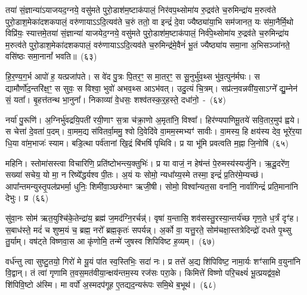 तया॑ सं॒ज्ञान्या॑\-ऽयाजयद॒ग्नये॒ वसु॑मते पुरो॒डाश॑\-म॒ष्टा\-क॑पालं॒ निर॑वप॒थ्सोमा॑य रु॒द्रव॑ते च॒रुमिन्द्रा॑य म॒रुत्व॑ते पुरो॒डाश॒मेका॑\-दश\-कपालं॒ वरु॑णाया\-ऽऽ\-दि॒त्यव॑ते च॒रुं ततो॒ वा इन्द्रं॑ दे॒वा ज्यैष्ठ्या॑या॒भि सम॑जानत॒ यः स॑मा॒नैर्मि॒थो विप्रि॑यः॒ स्यात्तमे॒तया॑ सं॒ज्ञान्या॑ याजयेद॒ग्नये॒ वसु॑मते पुरो॒डाश॑\-म॒ष्टा\-क॑पालं॒ निर्व॑पे॒थ्सोमा॑य रु॒द्रव॑ते च॒रुमिन्द्रा॑य म॒रुत्व॑ते पुरो॒डाश॒मेका॑\-दश\-कपालं॒ वरु॑णाया\-ऽऽ\-दि॒त्यव॑ते च॒रुमिन्द्र॑मे॒वैनं॑ भू॒तं ज्यैष्ठ्या॑य समा॒ना अ॒भिसञ्जा॑नते॒ वसि॑ष्ठः समा॒नानां᳚ भवति॥~(६३)\ip

{\anuvakamend[{विश॑मे॒व ति॑ष्ठन्त्ये॒तामे॒वाथै॒न्द्रस्य॑ याज्यानुवा॒क्ये॑ तं वरु॑णाय॒ चतु॑र्दश च}]}


हि॒र॒ण्य॒ग॒र्भ आपो॑ ह॒ यत्प्रजा॑पते। स वे॑द पु॒त्रः पि॒तर॒ꣳ॒ स मा॒तर॒ꣳ॒ स सू॒नुर्भु॑व॒थ्स भु॑व॒त्पुन॑र्मघः। स द्यामौर्णो॑द॒न्तरि॑क्ष॒ꣳ॒ स सुवः॒ स विश्वा॒ भुवो॑ अभव॒थ्स आ\-ऽभ॑वत्। उदु॒त्यं चि॒त्रम्। सप्र॑त्न॒वन्नवी॑य॒सा\-ऽग्ने᳚ द्यु॒म्नेन॑ सं॒ यता᳚। बृ॒हत्त॑तन्थ भा॒नुना᳚। निकाव्या॑ वे॒धसः॒ शश्व॑तस्क॒र्॒\mbox{}हस्ते॒ दधा॑नो॒~-~(६४)\ip

नर्या॑ पु॒रूणि॑। अ॒ग्निर्भु॑वद्रयि॒पती॑ रयी॒णाꣳ स॒त्रा च॑क्रा॒णो अ॒मृता॑नि॒ विश्वा᳚। हिर॑ण्यपाणिमू॒तये॑ सवि॒तार॒मुप॑ ह्वये। स चेत्ता॑ दे॒वता॑ प॒दम्। वा॒मम॒द्य स॑वितर्वा॒ममु॒ श्वो दि॒वेदि॑वे वा॒मम॒स्मभ्यꣳ॑ सावीः। वा॒मस्य॒ हि क्षय॑स्य देव॒ भूरे॑र॒या धि॒या वा॑म॒भाजः॑ स्याम। बडि॒त्था पर्व॑तानां खि॒द्रं बि॑भर्\mbox{}षि पृथिवि। प्र या भू॑मि प्रवत्वति म॒ह्ना जि॒नोषि॑~(६५)\ip

महिनि। स्तोमा॑सस्त्वा विचारिणि॒ प्रति॑ष्टोभन्त्य॒क्तुभिः॑। प्र या वाजं॒ न हेष॑न्तं पे॒रुमस्य॑स्यर्जुनि। ऋ॒दू॒दरे॑ण॒ सख्या॑ सचेय॒ यो मा॒ न रिष्ये᳚द्धर्यश्व पी॒तः। अ॒यं यः सोमो॒ न्यधा᳚य्य॒स्मे तस्मा॒ इन्द्रं॑ प्र॒तिर॑मे॒म्यच्छ॑। आपा᳚न्तमन्युस्तृ॒पल॑प्रभर्मा॒ धुनिः॒ शिमी॑वा॒ञ्छरु॑माꣳ ऋजी॒षी। सोमो॒ विश्वा᳚न्यत॒सा वना॑नि॒ नार्वागिन्द्रं॑ प्रति॒माना॑नि देभुः। प्र~(६६)\ip

सु॑वा॒नः सोम॑ ऋत॒युश्चि॑के॒तेन्द्रा॑य॒ ब्रह्म॑ ज॒मद॑ग्नि॒रर्चन्न्॑। वृषा॑ य॒न्तासि॒ शव॑सस्तु॒\-रस्या॒न्तर्य॑च्छ गृण॒ते ध॒र्त्रं दृꣳ॑ह। स॒बाध॑स्ते॒ मदं॑ च शुष्म॒यं च॒ ब्रह्म॒ नरो᳚ ब्रह्म॒कृतः॑ सपर्यन्न्। अ॒र्को वा॒ यत्तु॒रते॒ सोम॑चक्षा॒स्तत्रेदिन्द्रो॑ दधते पृ॒थ्सु तु॒र्याम्। वष॑ट्ते विष्णवा॒स आ कृ॑णोमि॒ तन्मे॑ जुषस्व शिपिविष्ट ह॒व्यम्।~(६७)\ip

वर्ध॑न्तु त्वा सुष्टु॒तयो॒ गिरो॑ मे यू॒यं पा॑त स्व॒स्तिभिः॒ सदा॑ नः। प्र तत्ते॑ अ॒द्य शि॑पिविष्ट॒ नामा॒र्यः शꣳ॑सामि व॒युना॑नि वि॒द्वान्। तं त्वा॑ गृणामि त॒वस॒मत॑वीया॒न्क्षय॑न्तम॒स्य रज॑सः परा॒के। किमित्ते॑ विष्णो परि॒चक्ष्यं॑ भू॒त्प्रयद्व॑व॒क्षे शि॑पिवि॒ष्टो अ॑स्मि। मा वर्पो॑ अ॒स्मदप॑गूह ए॒तद्यद॒न्यरू॑पः समि॒थे ब॒भूथ॑।~(६८)\ip

